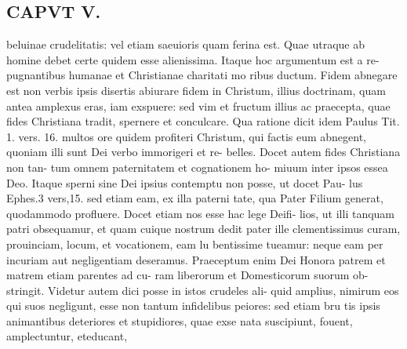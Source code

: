 \documentclass{article}
\begin{document}
\begin{pages}
\section*{CAPVT  V. }
\marginpar{[ p.267 ]}beluinae crudelitatis: vel etiam saeuioris quam ferina est. Quae utraque ab homine debet certe quidem esse alienissima. Itaque hoc argumentum est a re- pugnantibus humanae et Christianae charitati mo ribus ductum. Fidem abnegare est non verbis ipsis disertis abiurare fidem in Christum, illius doctrinam, quam antea amplexus eras, iam exspuere: sed vim et fructum illius ac praecepta, quae fides Christiana tradit, spernere et conculcare. Qua ratione dicit idem Paulus Tit. 1. vers. 16. multos ore quidem profiteri Christum, qui factis eum abnegent, quoniam illi sunt Dei verbo immorigeri et re- belles. Docet autem fides Christiana non tan- tum omnem paternitatem et cognationem ho- miuum inter ipsos essea Deo. Itaque sperni sine Dei ipsius contemptu non posse, ut docet Pau- lus Ephes.3 vers,15. sed etiam eam, ex illa paterni tate, qua Pater Filium generat, quodammodo profluere. Docet etiam nos esse hac lege Deifi- lios, ut illi tanquam patri obsequamur, et quam cuique nostrum dedit pater ille clementissimus curam, prouinciam, locum, et vocationem, eam lu bentissime tueamur: neque eam per incuriam aut negligentiam deseramus. Praeceptum enim Dei Honora patrem et matrem etiam parentes ad cu- ram liberorum et Domesticorum suorum ob- stringit. Videtur autem dici posse in istos crudeles ali- quid amplius, nimirum eos qui suos negligunt, esse non tantum infidelibus peiores: sed etiam bru tis ipsis animantibus deteriores et stupidiores, quae exse nata suscipiunt, fouent, amplectuntur, eteducant, 

\end{pages}
\end{document}
